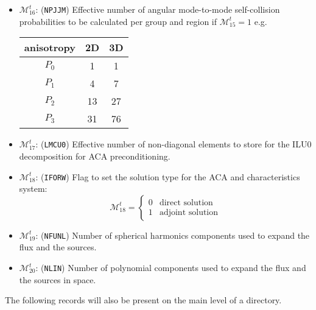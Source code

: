 \begin{itemize}
\item $\mathcal{M}^{t}_{16}$: ({\tt NPJJM}) Effective number of angular mode-to-mode self-collision probabilities to be calculated per group and region if $\mathcal{M}^{t}_{15}=1$ e.g.
\begin{center}
\begin{tabular}{|c|c|c|}
 anisotropy & 2D & 3D \\ \hline
$P_0$       &  1 &  1 \\
$P_1$       &  4 &  7 \\
$P_2$       & 13 & 27 \\
$P_3$       & 31 & 76 \\ \hline
\end{tabular}
\end{center}

\item $\mathcal{M}^{t}_{17}$: ({\tt LMCU0}) Effective number of non-diagonal elements to store for the ILU0 decomposition for ACA preconditioning.
 
\item $\mathcal{M}^{t}_{18}$: ({\tt IFORW}) Flag to set the solution type for the ACA and characteristics system:
\begin{displaymath}
\mathcal{M}^{t}_{18} = \left\{
\begin{array}{rl}
 0 & \textrm{direct solution} \\
 1 & \textrm{adjoint solution}
\end{array} \right.
\end{displaymath}

\item $\mathcal{M}^{t}_{19}$: ({\tt NFUNL}) Number of spherical harmonics components used to expand the flux and the sources.

\item $\mathcal{M}^{t}_{20}$: ({\tt NLIN}) Number of polynomial components used to expand the flux and the sources in space.

\end{itemize}

The following records will also be present on the main level of a 
directory.

